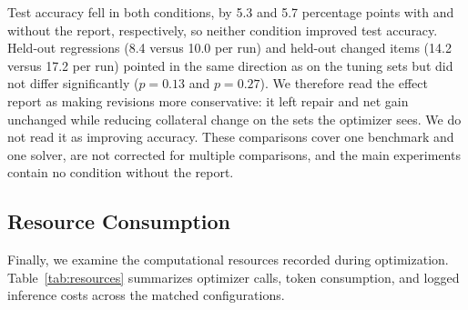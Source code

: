 \documentclass[10pt]{article} %
\begin{document}
Test accuracy fell in both conditions, by 5.3 and 5.7 percentage points with and without the report, respectively, so neither condition improved test accuracy. Held-out regressions (8.4 versus 10.0 per run) and held-out changed items (14.2 versus 17.2 per run) pointed in the same direction as on the tuning sets but did not differ significantly ($p=0.13$ and $p=0.27$). We therefore read the effect report as making revisions more conservative: it left repair and net gain unchanged while reducing collateral change on the sets the optimizer sees. We do not read it as improving accuracy. These comparisons cover one benchmark and one solver, are not corrected for multiple comparisons, and the main experiments contain no condition without the report.

\subsection{Resource Consumption}
\label{sec:resources}

Finally, we examine the computational resources recorded during optimization. Table~\ref{tab:resources} summarizes optimizer calls, token consumption, and logged inference costs across the matched configurations.
\end{document}
